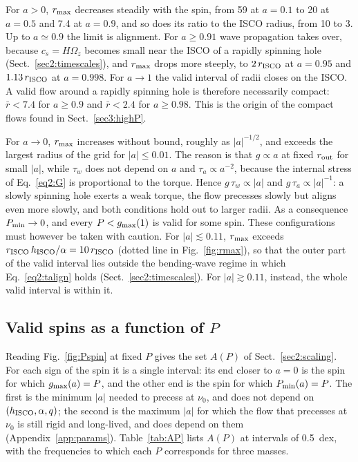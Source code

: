 For $a>0$, $r_\textup{max}$ decreases steadily with the spin, from 59 at $a=0.1$ to 20 at $a=0.5$ and 7.4 at $a=0.9$, and so does its ratio to the ISCO radius, from 10 to 3.
Up to $a\simeq0.9$ the limit is alignment.
For $a\geq0.91$ wave propagation takes over, because $c_s=H\Omega_z$ becomes small near the ISCO of a rapidly spinning hole (Sect.~\ref{sec2:timescales}), and $r_\textup{max}$ drops more steeply, to $2\,r_\textup{ISCO}$ at $a=0.95$ and $1.13\,r_\textup{ISCO}$ at $a=0.998$.
For $a\to1$ the valid interval of radii closes on the ISCO.
A valid flow around a rapidly spinning hole is therefore necessarily compact: $\bar r<7.4$ for $a\geq0.9$ and $\bar r<2.4$ for $a\geq0.98$.
This is the origin of the compact flows found in Sect.~\ref{sec3:highP}.

For $a\to0$, $r_\textup{max}$ increases without bound, roughly as $|a|^{-1/2}$, and exceeds the largest radius of the grid for $|a|\leq0.01$.
The reason is that $g\propto a$ at fixed $r_\textup{out}$ for small $|a|$, while $\tau_w$ does not depend on $a$ and $\tau_a\propto a^{-2}$, because the internal stress of Eq.~\eqref{eq2:G} is proportional to the torque.
Hence $g\,\tau_w\propto|a|$ and $g\,\tau_a\propto|a|^{-1}$: a slowly spinning hole exerts a weak torque, the flow precesses slowly but aligns even more slowly, and both conditions hold out to larger radii.
As a consequence $P_\textup{min}\to0$, and every $P<g_\textup{max}(1)$ is valid for some spin.
These configurations must however be taken with caution.
For $|a|\lesssim0.11$, $r_\textup{max}$ exceeds $r_\textup{ISCO}\,h_\textup{ISCO}/\alpha=10\,r_\textup{ISCO}$ (dotted line in Fig.~\ref{fig:rmax}), so that the outer part of the valid interval lies outside the bending-wave regime in which Eq.~\eqref{eq2:talign} holds (Sect.~\ref{sec2:timescales}).
For $|a|\gtrsim0.11$, instead, the whole valid interval is within it.

\subsection{Valid spins as a function of $P$}
\label{sec4:AP}

Reading Fig.~\ref{fig:Pspin} at fixed $P$ gives the set $A(P)$ of Sect.~\ref{sec2:scaling}.
For each sign of the spin it is a single interval: its end closer to $a=0$ is the spin for which $g_\textup{max}(a)=P$, and the other end is the spin for which $P_\textup{min}(a)=P$.
The first is the minimum $|a|$ needed to precess at $\nu_0$, and does not depend on $(h_\textup{ISCO}, \alpha, q)$; the second is the maximum $|a|$ for which the flow that precesses at $\nu_0$ is still rigid and long-lived, and does depend on them (Appendix~\ref{app:params}).
Table~\ref{tab:AP} lists $A(P)$ at intervals of 0.5~dex, with the frequencies to which each $P$ corresponds for three masses.

